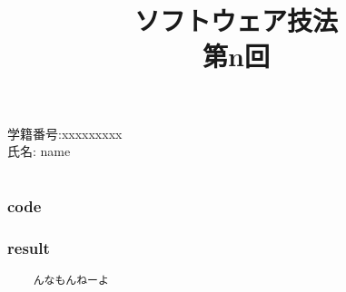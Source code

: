 

\renewcommand{\thesubsection}{\arabic{section} - (\alph{subsection})}
\renewcommand{\thesection}{課題\arabic{section}}


\lstset{language=[Objective]caml}

\makeatother
\setlength{\oddsidemargin}{-2mm}
\setlength{\evensidemargin}{-2mm}
\setlength{\topmargin}{-30mm}
\setlength{\textwidth}{164mm}
\setlength{\textheight}{250mm}

\makeatletter
\title{\rm ソフトウェア技法 \\ 第n回}
\date{}



\maketitle

\begin{description}
	\item[\rm \large 学籍番号:xxxxxxxxx]
	\item[\rm \large 氏名: name]
\end{description}

\section{}
\subsection{}
\subsubsection*{code}
\subsubsection*{result}
\begin{lstlisting}
	んなもんねーよ
\end{lstlisting}




